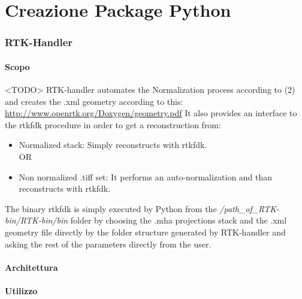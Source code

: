 \documentclass[a4paper,11pt, oneside]{article}
\begin{document}
 
  
  
  

            
    \part{Creazione Package Python}
        \section{RTK-Handler}
            \subsection{Scopo}
                \par 
                    <TODO>
                    RTK-handler automates the Normalization process according to (2) and creates the .xml geometry according to this:\newline
                    \url{http://www.openrtk.org/Doxygen/geometry.pdf}\newline\newline
                    It also provides an interface to the rtkfdk procedure in order to get a reconstruction from:
                    \begin{itemize}
                    \item Normalized stack:
                    Simply reconstructs with rtkfdk.
                    \newline
                    \\OR
                    \item Non normalized .tiff set:
                        It performs an auto-normalization and than reconstructs with rtkfdk.\newline
                        \end{itemize}
                        The binary rtkfdk is simply executed by Python from the \textit{/path\_of\_RTK-bin/RTK-bin/bin} 
                        folder by choosing the .mha projections stack and the .xml geometry file directly by the folder structure generated by RTK-handler and asking the rest of the parameters directly from the user. 
            \subsection{Architettura}
            \subsection{Utilizzo}
\end{document}
